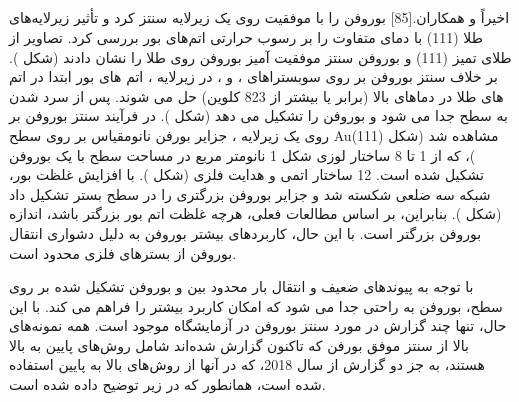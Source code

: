 \subsection{}
اخیراً  و همکاران.[85] بوروفن را با موفقیت روی یک زیرلایه  سنتز کرد و تأثیر زیرلایه‌های طلا (111) با دمای متفاوت را بر رسوب حرارتی اتم‌های بور بررسی کرد. تصاویر  از طلای تمیز (111) و بوروفن سنتز موفقیت آمیز بوروفن روی طلا را نشان دادند (شکل ). بر خلاف سنتز بوروفن بر روی سوبستراهای ،  و ، در زیرلایه ، اتم های بور ابتدا در اتم های طلا در دماهای بالا (برابر یا بیشتر از 823 کلوین) حل می شوند. پس از سرد شدن به سطح جدا می شود و بوروفن را تشکیل می دهد (شکل ). در فرآیند سنتز بوروفن بر روی یک زیرلایه ، جزایر بورفن نانومقیاس بر روی سطح Au(111) مشاهده شد (شکل )، که از 1 تا 8 ساختار لوزی شکل 1 نانومتر مربع در مساحت سطح با یک بوروفن تشکیل شده است. 12 ساختار اتمی و هدایت فلزی (شکل ). با افزایش غلظت بور، شبکه سه ضلعی شکسته شد و جزایر بوروفن بزرگتری را در سطح بستر تشکیل داد (شکل ). بنابراین، بر اساس مطالعات فعلی، هرچه غلظت اتم بور بزرگتر باشد، اندازه بوروفن بزرگتر است. با این حال، کاربردهای بیشتر بوروفن به دلیل دشواری انتقال بوروفن از بسترهای فلزی محدود است.

با توجه به پیوندهای ضعیف و انتقال بار محدود بین  و بوروفن تشکیل شده بر روی سطح، بوروفن به راحتی جدا می شود که امکان کاربرد بیشتر را فراهم می کند. با این حال، تنها چند گزارش در مورد سنتز بوروفن در آزمایشگاه موجود است. همه نمونه‌های بالا از سنتز موفق بورفن که تاکنون گزارش شده‌اند شامل روش‌های پایین به بالا هستند، به جز دو گزارش از سال 2018، که در آنها از روش‌های بالا به پایین استفاده شده است، همانطور که در زیر توضیح داده شده است.
